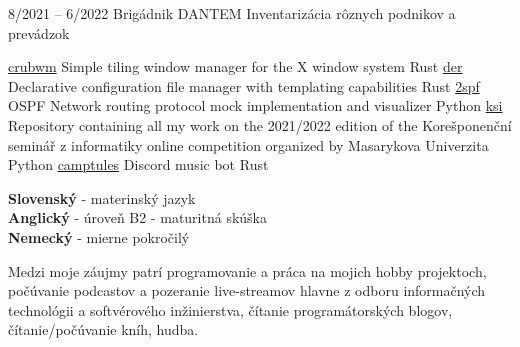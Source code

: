 \documentclass[9pt]{developercv} %
\begin{document}

\begin{entrylist}
	\entry
		{8/2021 -- 6/2022}
		{Brigádnik}
		{DANTEM}
		{Inventarizácia rôznych podnikov a prevádzok}
\end{entrylist}


\begin{entrylist}
	\entry
		{\href{https://github.com/ThyW/crubwm}{crubwm}}
		{Simple tiling window manager for the X window system}
		{Rust}
		{}
	\entry 
		{\href{https://github.com/ThyW/der}{der}}
		{Declarative configuration file manager with templating capabilities}
		{Rust}
		{}
	\entry
		{\href{https://github.com/ThyW/2spf}{2spf}}
		{OSPF Network routing protocol mock implementation and visualizer}
		{Python}
		{}
	\entry
		{\href{https://github.com/ThyW/ksi}{ksi}}
		{Repository containing all my work on the 2021/2022 edition of the Korešponenční seminář z informatiky online competition organized by Masarykova Univerzita}
		{Python}
		{}
	\entry
		{\href{https://gitea.redalder.org/ThyW/camptules}{camptules}}
		{Discord music bot}
		{Rust}
		{}
\end{entrylist}


\begin{minipage}[t]{0.5\textwidth}
	\vspace{-\baselineskip} %

	
	\textbf{Slovenský} - materinský jazyk\\
	\textbf{Anglický} - úroveň B2 - maturitná skúška\\
	\textbf{Nemecký} - mierne pokročilý
\end{minipage}
\hfill
\begin{minipage}[t]{0.5\textwidth}
	\vspace{-\baselineskip} %
	
	
	Medzi moje záujmy patrí programovanie a práca na mojich hobby projektoch, počúvanie podcastov a pozeranie live-streamov hlavne z odboru informačných technológii a softvérového inžinierstva, čítanie programátorských blogov, čítanie/počúvanie kníh, hudba.
\end{minipage}
\end{document}

